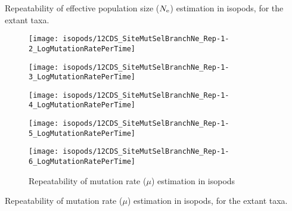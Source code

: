 \begin{table}[htbp]
    \renewcommand{\arraystretch}{0.5}
    \scriptsize
    \noindent{}
    \caption[Repeatability of $\Ne$ estimation in isopods]{Repeatability of {effective population size} ($\Ne$) estimation in isopods, for the extant taxa.}
    \label{tab:Ne-estimated-isopods}
\end{table}

\begin{figure}[H]
    \centering
    \begin{minipage}{0.32\linewidth}
        \texttt{[image: isopods/12CDS\_SiteMutSelBranchNe\_Rep-1-2\_LogMutationRatePerTime]}
    \end{minipage} \hfill
    \begin{minipage}{0.32\linewidth}
        \texttt{[image: isopods/12CDS\_SiteMutSelBranchNe\_Rep-1-3\_LogMutationRatePerTime]}
    \end{minipage} \hfill
    \begin{minipage}{0.32\linewidth}
        \texttt{[image: isopods/12CDS\_SiteMutSelBranchNe\_Rep-1-4\_LogMutationRatePerTime]}
    \end{minipage}
    \begin{minipage}{0.32\linewidth}
        \texttt{[image: isopods/12CDS\_SiteMutSelBranchNe\_Rep-1-5\_LogMutationRatePerTime]}
    \end{minipage}
    \begin{minipage}{0.32\linewidth}
        \texttt{[image: isopods/12CDS\_SiteMutSelBranchNe\_Rep-1-6\_LogMutationRatePerTime]}
    \end{minipage}
    \caption[Repeatability of $\mu$ estimation in isopods]{Repeatability of mutation rate ($\mu$) estimation in isopods}
\end{figure}

\begin{table}[htbp]
    \renewcommand{\arraystretch}{0.5}
    \scriptsize
    \noindent{}
    \caption[Repeatability of mutation rate estimation in isopods]{Repeatability of mutation rate ($\mu$) estimation in isopods, for the extant taxa.}
\end{table}

